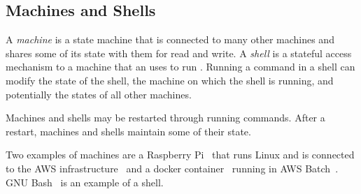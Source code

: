 \subsection{Machines and Shells}\label{machine}\label{machines}\label{shell}\label{shells}

A \emph{machine} is a state machine that is connected to many other machines and shares some of its state with them for read and write. A \emph{shell} is a stateful access mechanism to a machine that an  uses to run . Running a command in a shell can modify the state of the shell, the machine on which the shell is running, and potentially the states of all other machines. 

Machines and shells may be restarted through running commands. After a restart, machines and shells maintain some of their state.

Two examples of machines are a Raspberry Pi~\cite{rpi} that runs Linux and is connected to the AWS infrastructure~\cite{aws} and a docker container~\cite{docker} running in AWS Batch~\cite{aws_batch}. GNU Bash~\cite{gnu_bash} is an example of a shell.